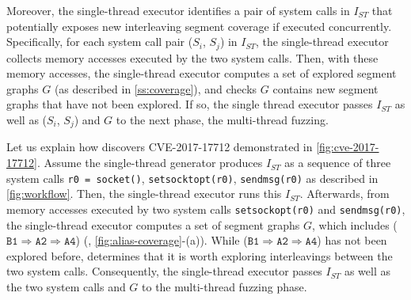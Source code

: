 Moreover, the single-thread executor identifies a pair of system calls
in $I_{ST}$ that potentially exposes new interleaving segment coverage
if executed concurrently.
%
Specifically, for each system call pair ($S_i$, $S_j$) in $I_{ST}$,
the single-thread executor collects memory accesses executed by the
two system calls. Then, with these memory accesses, the single-thread
executor computes a set of explored segment graphs $G$ (as described
in \autoref{ss:coverage}), and checks $G$ contains new segment graphs
that have not been explored.
%
If so, the single thread executor passes $I_{ST}$ as well as ($S_i$,
$S_j$) and $G$ to the next phase, the multi-thread fuzzing.


%
Let us explain how \sys discovers CVE-2017-17712 demonstrated in
\autoref{fig:cve-2017-17712}.
%
Assume the single-thread generator produces $I_{ST}$ as a sequence of
three system calls \texttt{r0 = socket()}, \texttt{setsocktopt(r0)},
\texttt{sendmsg(r0)} as described in \autoref{fig:workflow}.
%
Then, the single-thread executor runs this $I_{ST}$. Afterwards, from
memory accesses executed by two system calls \texttt{setsockopt(r0)}
and \texttt{sendmsg(r0)}, the single-thread executor computes a set of
segment graphs $G$, which includes
($\texttt{B1} \Rightarrow \texttt{A2} \Rightarrow \texttt{A4}$) (\ie,
\autoref{fig:alias-coverage}-(a)).
%
While ($\texttt{B1} \Rightarrow \texttt{A2} \Rightarrow \texttt{A4}$)
has not been explored before, \sys determines that it is worth
exploring interleavings between the two system calls.
%
Consequently, the single-thread executor passes $I_{ST}$ as well as
the two system calls and $G$ to the multi-thread fuzzing phase.



%





